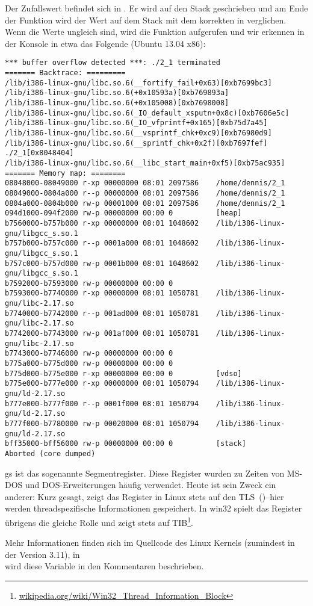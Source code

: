 Der Zufallswert befindet sich in .
Er wird auf den Stack geschrieben und am Ende der Funktion wird der Wert auf dem Stack mit dem korrekten  in
 verglichen.
Wenn die Werte ungleich sind, wird die Funktion  aufgerufen und wir erkennen in der Konsole in
etwa das Folgende (Ubuntu 13.04 x86):

\begin{lstlisting}
*** buffer overflow detected ***: ./2_1 terminated
======= Backtrace: =========
/lib/i386-linux-gnu/libc.so.6(__fortify_fail+0x63)[0xb7699bc3]
/lib/i386-linux-gnu/libc.so.6(+0x10593a)[0xb769893a]
/lib/i386-linux-gnu/libc.so.6(+0x105008)[0xb7698008]
/lib/i386-linux-gnu/libc.so.6(_IO_default_xsputn+0x8c)[0xb7606e5c]
/lib/i386-linux-gnu/libc.so.6(_IO_vfprintf+0x165)[0xb75d7a45]
/lib/i386-linux-gnu/libc.so.6(__vsprintf_chk+0xc9)[0xb76980d9]
/lib/i386-linux-gnu/libc.so.6(__sprintf_chk+0x2f)[0xb7697fef]
./2_1[0x8048404]
/lib/i386-linux-gnu/libc.so.6(__libc_start_main+0xf5)[0xb75ac935]
======= Memory map: ========
08048000-08049000 r-xp 00000000 08:01 2097586    /home/dennis/2_1
08049000-0804a000 r--p 00000000 08:01 2097586    /home/dennis/2_1
0804a000-0804b000 rw-p 00001000 08:01 2097586    /home/dennis/2_1
094d1000-094f2000 rw-p 00000000 00:00 0          [heap]
b7560000-b757b000 r-xp 00000000 08:01 1048602    /lib/i386-linux-gnu/libgcc_s.so.1
b757b000-b757c000 r--p 0001a000 08:01 1048602    /lib/i386-linux-gnu/libgcc_s.so.1
b757c000-b757d000 rw-p 0001b000 08:01 1048602    /lib/i386-linux-gnu/libgcc_s.so.1
b7592000-b7593000 rw-p 00000000 00:00 0
b7593000-b7740000 r-xp 00000000 08:01 1050781    /lib/i386-linux-gnu/libc-2.17.so
b7740000-b7742000 r--p 001ad000 08:01 1050781    /lib/i386-linux-gnu/libc-2.17.so
b7742000-b7743000 rw-p 001af000 08:01 1050781    /lib/i386-linux-gnu/libc-2.17.so
b7743000-b7746000 rw-p 00000000 00:00 0
b775a000-b775d000 rw-p 00000000 00:00 0
b775d000-b775e000 r-xp 00000000 00:00 0          [vdso]
b775e000-b777e000 r-xp 00000000 08:01 1050794    /lib/i386-linux-gnu/ld-2.17.so
b777e000-b777f000 r--p 0001f000 08:01 1050794    /lib/i386-linux-gnu/ld-2.17.so
b777f000-b7780000 rw-p 00020000 08:01 1050794    /lib/i386-linux-gnu/ld-2.17.so
bff35000-bff56000 rw-p 00000000 00:00 0          [stack]
Aborted (core dumped)
\end{lstlisting}

gs ist das sogenannte Segmentregister. Diese Register wurden zu Zeiten von MS-DOS und DOS-Erweiterungen häufig
verwendet. Heute ist sein Zweck ein anderer:
Kurz gesagt, zeigt das  Register in Linux stets auf den \ac{TLS}~()--hier werden threadspezifische
Informationen gespeichert. In win32 spielt das  Register übrigens die gleiche Rolle und zeigt stets auf
\ac{TIB}\footnote{\href{http://go.yurichev.com/17104}{wikipedia.org/wiki/Win32\_Thread\_Information\_Block}}.

Mehr Informationen finden sich im Quellcode des Linux Kernels (zumindest in der Version 3.11), in\\
 wird diese Variable in den Kommentaren beschrieben.



